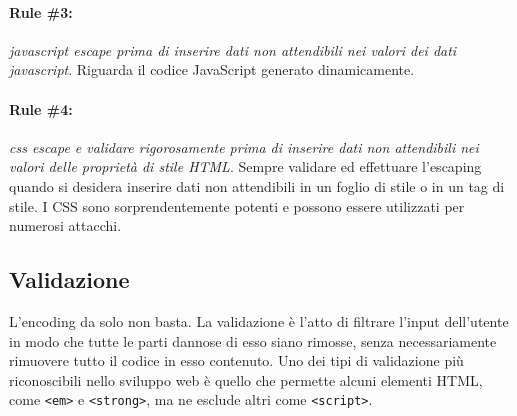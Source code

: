 \paragraph{Rule \#3:} \textit{javascript escape prima di inserire dati non attendibili
      nei valori dei dati javascript}.
Riguarda il codice JavaScript generato dinamicamente.

\paragraph{Rule \#4:} \textit{css escape e validare rigorosamente prima di inserire
      dati non attendibili nei valori delle proprietà di stile HTML}.
Sempre validare ed effettuare l'escaping quando si desidera inserire dati non
attendibili in un foglio di stile o in un
tag di stile. I CSS
sono sorprendentemente potenti e possono essere utilizzati per numerosi attacchi.

\subsection{Validazione}

L'encoding da solo non basta.
La validazione è l'atto di filtrare l'input dell'utente in modo che tutte le
parti dannose di esso
siano rimosse, senza necessariamente rimuovere tutto il codice in esso contenuto.
Uno dei
tipi di validazione più riconoscibili nello sviluppo web è quello che permette
alcuni elementi
HTML, come \verb|<em>| e \verb|<strong>|, ma ne esclude altri come \verb|<script>|.